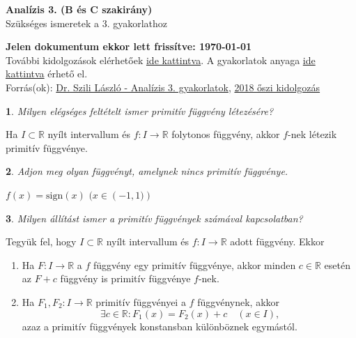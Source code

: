 \documentclass[a4paper]{article}
\def\R{\mathbb{R}}
\theoremstyle{qstyle}
\newtheorem{question}{}{}
\begin{document}
	\begin{center}
		{\Large\textbf{Analízis 3. (B és C szakirány)}}\\
		{\Large Szükséges ismeretek a 3. gyakorlathoz}
	\end{center}

	\begin{framed}
		\textbf{Jelen dokumentum ekkor lett frissítve: {\yyyymmdddate\today} \ \currenttime}\\
		További kidolgozások elérhetőek \href{https://people.inf.elte.hu/totadavid95/Analizis3/2019-tavasz/}{ide kattintva}. A gyakorlatok anyaga \href{http://numanal.inf.elte.hu/~szili/Oktatas/An3_BC_szakirany_2019/An3_BC_gyak_2019_tavasz.pdf}{ide kattintva} érhető el.\\	
		Forrás(ok): \href{http://numanal.inf.elte.hu/~szili/Oktatas/An3_BC_szakirany_2019/An3_BC_gyak_2019_tavasz.pdf}{Dr. Szili László - Analízis 3. gyakorlatok}, \href{https://people.inf.elte.hu/totadavid95/Analizis3/Anal3_def.pdf}{2018 őszi kidolgozás}
	\end{framed}

	\begin{question}
		Milyen \emph{elégséges} feltételt ismer primitív függvény létezésére?
	\end{question}
	Ha $I\subset\R$ nyílt intervallum és $f:I\to\R$ folytonos függvény, akkor $f$-nek létezik primitív függvénye.
	
	\begin{question}
		Adjon meg olyan függvényt, amelynek \emph{nincs} primitív függvénye.
	\end{question}
	$f(x)=\mathrm{sign}(x)$   \quad  $(x \in \left(-1,1)\right)$
	
	\begin{question}
		Milyen állítást ismer a primitív függvények számával kapcsolatban?
	\end{question}
	Tegyük fel, hogy $I \subset \R$ nyílt intervallum és $f : I \to \R$ adott függvény. Ekkor
	\vspace{-4mm}
	\begin{enumerate}
		\item Ha $F : I \to \R$ a $f$ függvény egy primitív függvénye, akkor minden $c\in\R$ esetén az $F + c$ függvény is primitív függvénye $f$-nek.
		\item Ha $F_1,F_2 : I \to \R$ primitív függvényei a $f$ függvénynek, akkor
		$$\exists c\in\R : F_1(x)=F_2(x)+c \quad (x \in I)\text{,}$$
		azaz a primitív függvények konstansban különböznek egymástól.
	\end{enumerate}
	\vspace{-4mm}
	
\end{document}
